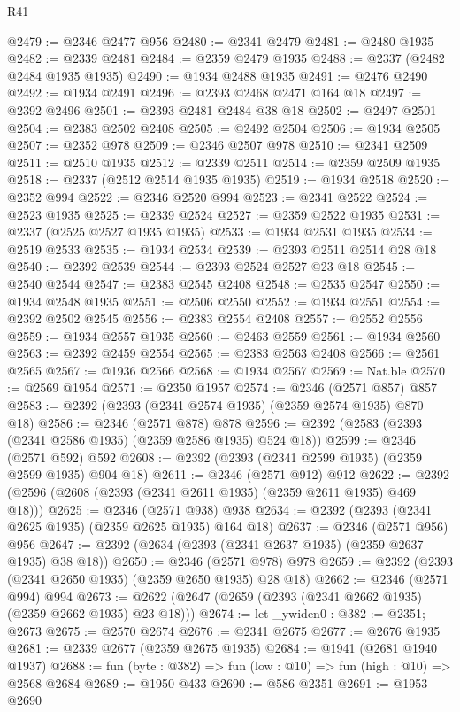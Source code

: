 \begin{lexlean}{R41}
\begin{coremodule}
{{{{{{{{{{{{{{{{{{{{{{{{{{{{{{{{{{{{{{{{{{{{{{{{{{{{{{{{{{{{{{{{{{{{{{{{{{{{{{{{{{{{{{{@2479 := @2346 @2477 @956
@2480 := @2341 @2479
@2481 := @2480 @1935
@2482 := @2339 @2481
@2484 := @2359 @2479 @1935
@2488 := @2337 (@2482 @2484 @1935 @1935)
@2490 := @1934 @2488 @1935
@2491 := @2476 @2490
@2492 := @1934 @2491
@2496 := @2393 @2468 @2471 @164 @18
@2497 := @2392 @2496
@2501 := @2393 @2481 @2484 @38 @18
@2502 := @2497 @2501
@2504 := @2383 @2502 @2408
@2505 := @2492 @2504
@2506 := @1934 @2505
@2507 := @2352 @978
@2509 := @2346 @2507 @978
@2510 := @2341 @2509
@2511 := @2510 @1935
@2512 := @2339 @2511
@2514 := @2359 @2509 @1935
@2518 := @2337 (@2512 @2514 @1935 @1935)
@2519 := @1934 @2518
@2520 := @2352 @994
@2522 := @2346 @2520 @994
@2523 := @2341 @2522
@2524 := @2523 @1935
@2525 := @2339 @2524
@2527 := @2359 @2522 @1935
@2531 := @2337 (@2525 @2527 @1935 @1935)
@2533 := @1934 @2531 @1935
@2534 := @2519 @2533
@2535 := @1934 @2534
@2539 := @2393 @2511 @2514 @28 @18
@2540 := @2392 @2539
@2544 := @2393 @2524 @2527 @23 @18
@2545 := @2540 @2544
@2547 := @2383 @2545 @2408
@2548 := @2535 @2547
@2550 := @1934 @2548 @1935
@2551 := @2506 @2550
@2552 := @1934 @2551
@2554 := @2392 @2502 @2545
@2556 := @2383 @2554 @2408
@2557 := @2552 @2556
@2559 := @1934 @2557 @1935
@2560 := @2463 @2559
@2561 := @1934 @2560
@2563 := @2392 @2459 @2554
@2565 := @2383 @2563 @2408
@2566 := @2561 @2565
@2567 := @1936 @2566
@2568 := @1934 @2567
@2569 := Nat.ble
@2570 := @2569 @1954
@2571 := @2350 @1957
@2574 := @2346 (@2571 @857) @857
@2583 := @2392 (@2393 (@2341 @2574 @1935) (@2359 @2574 @1935) @870 @18)
@2586 := @2346 (@2571 @878) @878
@2596 := @2392 (@2583 (@2393 (@2341 @2586 @1935) (@2359 @2586 @1935) @524 @18))
@2599 := @2346 (@2571 @592) @592
@2608 := @2392 (@2393 (@2341 @2599 @1935) (@2359 @2599 @1935) @904 @18)
@2611 := @2346 (@2571 @912) @912
@2622 := @2392 (@2596 (@2608 (@2393 (@2341 @2611 @1935) (@2359 @2611 @1935) @469 @18)))
@2625 := @2346 (@2571 @938) @938
@2634 := @2392 (@2393 (@2341 @2625 @1935) (@2359 @2625 @1935) @164 @18)
@2637 := @2346 (@2571 @956) @956
@2647 := @2392 (@2634 (@2393 (@2341 @2637 @1935) (@2359 @2637 @1935) @38 @18))
@2650 := @2346 (@2571 @978) @978
@2659 := @2392 (@2393 (@2341 @2650 @1935) (@2359 @2650 @1935) @28 @18)
@2662 := @2346 (@2571 @994) @994
@2673 := @2622 (@2647 (@2659 (@2393 (@2341 @2662 @1935) (@2359 @2662 @1935) @23 @18)))
@2674 := let _ywiden0 : @382 := @2351; @2673
@2675 := @2570 @2674
@2676 := @2341 @2675
@2677 := @2676 @1935
@2681 := @2339 @2677 (@2359 @2675 @1935)
@2684 := @1941 (@2681 @1940 @1937)
@2688 := fun (byte : @382) => fun (low : @10) => fun (high : @10) => @2568 @2684
@2689 := @1950 @433
@2690 := @586 @2351
@2691 := @1953 @2690
}}}}}}}}}}}}}}}}}}}}}}}}}}}}}}}}}}}}}}}}}}}}}}}}}}}}}}}}}}}}}}}}}}}}}}}}}}}}}}}}}}}}}}}
\end{coremodule}
\end{lexlean}

